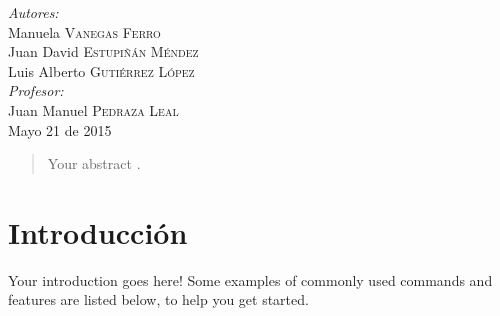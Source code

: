 \documentclass[12pt]{article}
\begin{document}
\begin{titlepage}
\Large \emph{Autores:}\\
Manuela \textsc{Vanegas Ferro}\\
Juan David \textsc{Estupi\~n\'an M\'endez}\\
Luis Alberto \textsc{Guti\'errez L\'opez}\\[2cm]

\Large \emph{Profesor:}\\
Juan Manuel \textsc{Pedraza Leal}\\[3cm]


{\large Mayo 21 de 2015}\\[2cm] %


 

\vfill %

\end{titlepage}

\tableofcontents
\pagebreak

\begin{abstract}
Your abstract\cite{kressler01} \cite{cleland67} \cite{turlings95} \cite{sallaud09} \cite {kirby09} \cite{harada09a} \cite{harada09b} \cite{crocker80} \cite{engerberg-kulka04}.
\end{abstract}

\section{Introducci\'on}

Your introduction goes here! Some examples of commonly used commands and features are listed below, to help you get started.
\end{document}
